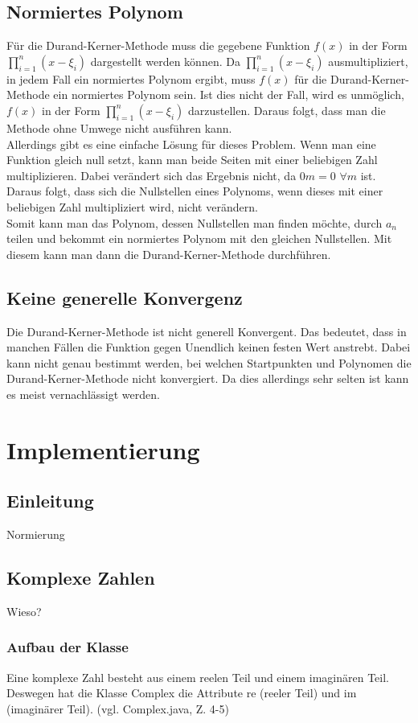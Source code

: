 \documentclass[12pt]{article}
\begin{document}
\subsection{Normiertes Polynom}
Für die Durand-Kerner-Methode muss die gegebene Funktion $f(x)$ in der Form $\prod_{i=1}^n (x-\xi_i)$ dargestellt werden können. Da $\prod_{i=1}^n (x-\xi_i)$ ausmultipliziert, in jedem Fall ein normiertes Polynom ergibt, muss $f(x)$ für die Durand-Kerner-Methode ein normiertes Polynom sein.
Ist dies nicht der Fall, wird es unmöglich, $f(x)$ in der Form $\prod_{i=1}^n (x-\xi_i)$ darzustellen. Daraus folgt, dass man die Methode ohne Umwege nicht ausführen kann. \\
Allerdings gibt es eine einfache Lösung für dieses Problem. Wenn man eine Funktion gleich null setzt, kann man beide Seiten mit einer beliebigen Zahl multiplizieren. Dabei verändert sich das Ergebnis nicht, da $0m = 0$ \space $\forall m$ ist. Daraus folgt, dass sich die Nullstellen eines Polynoms, wenn dieses mit einer beliebigen Zahl multipliziert wird, nicht verändern. \\
Somit kann man das Polynom, dessen Nullstellen man finden möchte, durch $a_n$ teilen und bekommt ein normiertes Polynom mit den gleichen Nullstellen. Mit diesem kann man dann die Durand-Kerner-Methode durchführen.

\subsection{Keine generelle Konvergenz}
Die Durand-Kerner-Methode ist nicht generell Konvergent. Das bedeutet, dass in manchen Fällen die Funktion gegen Unendlich keinen festen Wert anstrebt. Dabei kann nicht genau bestimmt werden, bei welchen Startpunkten und Polynomen die Durand-Kerner-Methode nicht konvergiert. Da dies allerdings sehr selten ist kann es meist vernachlässigt werden.

\section{Implementierung}
\subsection{Einleitung}
Normierung
\subsection{Komplexe Zahlen}
Wieso?

\subsubsection{Aufbau der Klasse}
Eine komplexe Zahl besteht aus einem reelen Teil und einem imaginären Teil. Deswegen hat die Klasse Complex die Attribute re (reeler Teil) und im (imaginärer Teil). 
(vgl. Complex.java, Z. 4-5)
\end{document}
